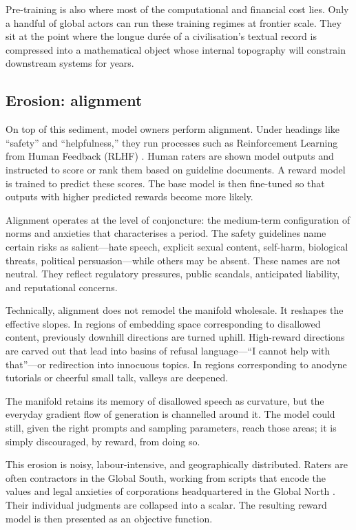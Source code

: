 \documentclass[12pt,a4paper]{article}
\begin{document}
Pre-training is also where most of the computational and financial cost lies. Only a handful of global actors can run these training regimes at frontier scale. They sit at the point where the longue durée of a civilisation's textual record is compressed into a mathematical object whose internal topography will constrain downstream systems for years.

\subsection{Erosion: alignment}

On top of this sediment, model owners perform alignment. Under headings like ``safety'' and ``helpfulness,'' they run processes such as Reinforcement Learning from Human Feedback (RLHF) \cite{ganguli2022red,henderson2023alignment,gabriel2020artificial,liang2022holistic}. Human raters are shown model outputs and instructed to score or rank them based on guideline documents. A reward model is trained to predict these scores. The base model is then fine-tuned so that outputs with higher predicted rewards become more likely.

Alignment operates at the level of conjoncture: the medium-term configuration of norms and anxieties that characterises a period. The safety guidelines name certain risks as salient---hate speech, explicit sexual content, self-harm, biological threats, political persuasion---while others may be absent. These names are not neutral. They reflect regulatory pressures, public scandals, anticipated liability, and reputational concerns.

Technically, alignment does not remodel the manifold wholesale. It reshapes the effective slopes. In regions of embedding space corresponding to disallowed content, previously downhill directions are turned uphill. High-reward directions are carved out that lead into basins of refusal language---``I cannot help with that''---or redirection into innocuous topics. In regions corresponding to anodyne tutorials or cheerful small talk, valleys are deepened.

The manifold retains its memory of disallowed speech as curvature, but the everyday gradient flow of generation is channelled around it. The model could still, given the right prompts and sampling parameters, reach those areas; it is simply discouraged, by reward, from doing so.

This erosion is noisy, labour-intensive, and geographically distributed. Raters are often contractors in the Global South, working from scripts that encode the values and legal anxieties of corporations headquartered in the Global North \cite{ganguli2022red}. Their individual judgments are collapsed into a scalar. The resulting reward model is then presented as an objective function.
\end{document}
